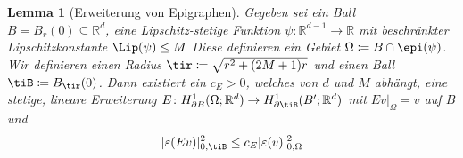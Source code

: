 \documentclass{scrartcl}
\newcounter{everything}
\newtheorem{lemma}[everything]{Lemma}
\def\R{\mathbb{R}}
\def\e{\varepsilon}
\DeclarePairedDelimiter{\abs}{|}{|}
\begin{document}
\begin{lemma}[Erweiterung von Epigraphen]\label{le:ErweiterungVonEpigraphen}
	Gegeben sei ein Ball $B=B_r(0)\subseteq\R^d$, eine Lipschitz-stetige Funktion $\psi\colon\R^{d-1}\to\R$ mit beschränkter Lipschitzkonstante $\Lip(\psi)\leq M$ Diese definieren ein Gebiet $\Omega\coloneqq B\cap\epi(\psi)$. Wir definieren einen Radius $\tir\coloneqq\sqrt{r^2+(2M+1)r}$ und einen Ball $\tiB\coloneqq B_{\tir}(0)$. Dann existiert ein $c_E>0$, welches von $d$ und $M$ abhängt, eine stetige, lineare Erweiterung $E\colon H^1_{\partial B}(\Omega;\R^d)\to H^1_{\partial \tiB}(B';\R^d)$ mit $Ev\vert_\Omega = v$ auf $B$ und
	\begin{align}
		\abs{\e(Ev)}_{0,\tiB}^2 \leq c_E\abs{\e(v)}_{0,\Omega}^2 \label{eq:ErweiterungEpigraphenUngleichung1}
	\end{align}
\end{lemma}
\end{document}

